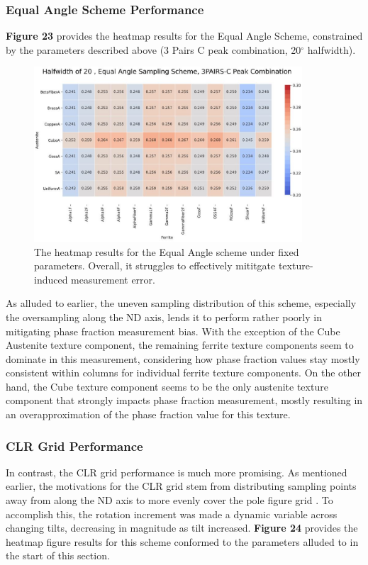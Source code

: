 \documentclass[10pt]{article}
\begin{document}
\subsubsection{Equal Angle Scheme Performance}
\textbf{Figure 23} provides the heatmap results for the Equal Angle Scheme, constrained by the parameters described above (3 Pairs C peak combination, 20$^{\circ}$ halfwidth).
\begin{figure}[h]
    \centering
    \includegraphics[width=10cm]{fig23}
    \caption{\label{tab1}The heatmap results for the Equal Angle scheme under fixed parameters. Overall, it struggles to effectively
    mititgate texture-induced measurement error.} 
    \end{figure}

As alluded to earlier, the uneven sampling distribution of this scheme, especially the oversampling along the ND axis, lends it to perform rather poorly 
in mitigating phase fraction measurement bias. With the exception of the Cube Austenite texture component, the remaining ferrite texture components 
seem to dominate in this measurement, considering how phase fraction values stay mostly consistent within columns for individual ferrite 
texture components. On the other hand, the Cube texture component seems to be the only austenite texture component that strongly impacts 
phase fraction measurement, mostly resulting in an overapproximation of the phase fraction value for this texture.

\subsubsection{CLR Grid Performance}
In contrast, the CLR grid performance is much more promising. As mentioned earlier, the
motivations for the CLR grid stem from distributing sampling points away 
from along the ND axis to more evenly cover the pole figure grid \cite{ref11}. To accomplish this,
the rotation increment was made a dynamic variable across changing tilts,
decreasing in magnitude as tilt increased. \textbf{Figure 24} provides the heatmap
figure results for this scheme conformed to the parameters alluded to in the
start of this section.
\end{document}
